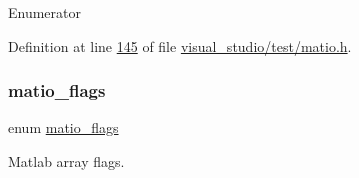 \begin{DoxyEnumFields}{Enumerator}
\end{DoxyEnumFields}


Definition at line \hyperlink{visual__studio_2test_2matio_8h_source_l00145}{145} of file \hyperlink{visual__studio_2test_2matio_8h_source}{visual\+\_\+studio/test/matio.\+h}.

\mbox{\label{group___m_a_t_gab9d6ef9e3ddca78a317b173f01d53fbb}} 
\subsubsection{\texorpdfstring{matio\+\_\+flags}{matio\_flags}\hspace{0.1cm}{\footnotesize\ttfamily [1/2]}}
{\footnotesize\ttfamily enum \hyperlink{group___m_a_t_gab9d6ef9e3ddca78a317b173f01d53fbb}{matio\+\_\+flags}}



Matlab array flags. 

